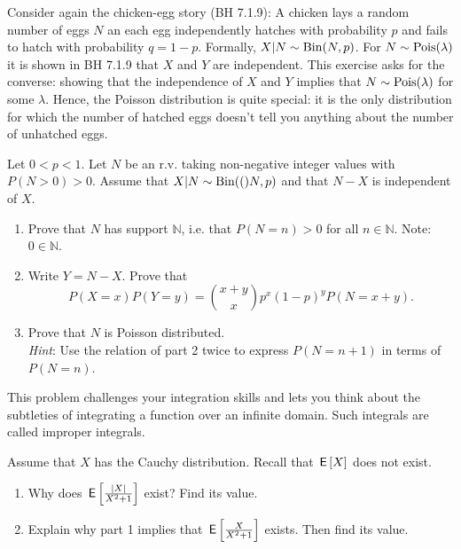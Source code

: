 \documentclass[assignments]{subfiles}
\begin{document}
\begin{exercise} %
Consider again the chicken-egg story (BH 7.1.9): A chicken lays a random number of eggs $N$ an each egg independently hatches with probability $p$ and fails to hatch with probability $q = 1-p$. Formally, $X|N\sim\mathrm{Bin}(N,p)$.
For $N \sim \mathrm{Pois}(\lambda)$ it is shown in BH 7.1.9 that $X$ and $Y$ are independent.
This exercise asks for the converse: showing that the independence of $X$ and $Y$ implies that $N \sim \mathrm{Pois}(\lambda)$ for some $\lambda$. 
Hence, the Poisson distribution is quite special: it is the only distribution for which the number of hatched eggs doesn't tell you anything about the number of unhatched eggs.

Let $0 < p < 1$. Let $N$ be an r.v. taking non-negative integer values with $P(N > 0) > 0$. 
Assume that  $X|N\sim\mathrm{Bin}(()N,p)$ and that $N-X$ is independent of $X$.

\begin{enumerate}
\item Prove that $N$ has support $\mathbb N$, i.e. that $P(N=n) > 0$ for all $n \in \mathbb N$. Note: $0 \in \mathbb N$. 
\item Write $Y = N-X$. Prove that
 $$P(X=x)P(Y=y) = \binom{x+y}{x} p^x (1-p)^y P(N=x+y).$$ 
\item  Prove that $N$ is Poisson distributed. \\
  \textit{Hint}: Use the relation of part 2 twice to express $P(N=n+1)$ in terms of $P(N=n)$.
\end{enumerate}
\end{exercise}




\begin{exercise} %
This problem challenges your integration skills and lets you think about the subtleties of integrating a function over an infinite domain. Such integrals are called improper integrals. 

Assume that $X$ has the Cauchy distribution. Recall that $\,\mathsf{E}\left[X\right]$ does not exist.
\begin{enumerate}
\item Why does $\,\mathsf{E}\left[\frac{|X|}{X^2+1}\right]$ exist? Find its value.
\item Explain why part 1 implies that $\,\mathsf{E}\left[\frac{X}{X^2+1}\right]$ exists. Then find its value.
\end{enumerate}
\end{exercise}
\end{document}
